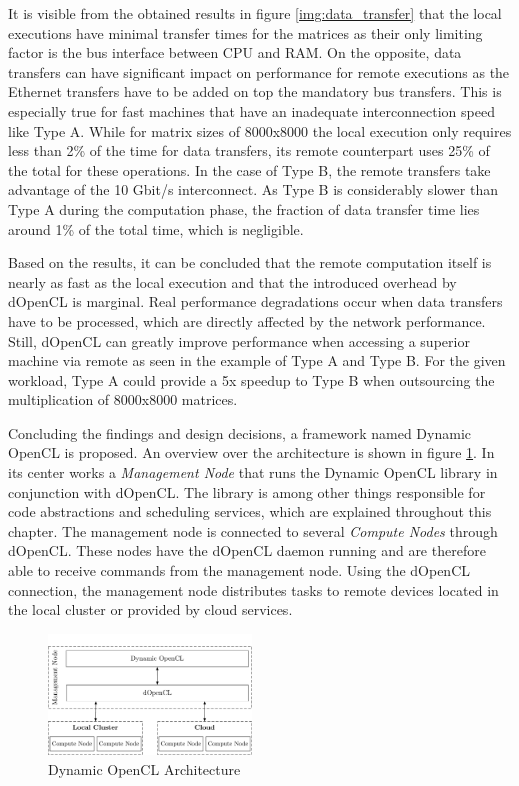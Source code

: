 It is visible from the obtained results in figure \ref{img:data_transfer} that the local executions have minimal transfer times for the matrices as their only limiting factor is the bus interface between CPU and RAM. On the opposite, data transfers can have significant impact on performance for remote executions as the Ethernet transfers have to be added on top the mandatory bus transfers. This is especially true for fast machines that have an inadequate interconnection speed like Type A. While for matrix sizes of 8000x8000 the local execution only requires less than 2\% of the time for data transfers, its remote counterpart uses 25\% of the total for these operations. In the case of Type B, the remote transfers take advantage of the 10 Gbit/s interconnect. As Type B is considerably slower than Type A during the computation phase, the fraction of data transfer time lies around 1\% of the total time, which is negligible.

Based on the results, it can be concluded that the remote computation itself is nearly as fast as the local execution and that the introduced overhead by dOpenCL is marginal. Real performance degradations occur when data transfers have to be processed, which are directly affected by the network performance. Still, dOpenCL can greatly improve performance when accessing a superior machine via remote as seen in the example of Type A and Type B. For the given workload, Type A could provide a 5x speedup to Type B when outsourcing the multiplication of 8000x8000 matrices.

Concluding the findings and design decisions, a framework named Dynamic OpenCL is proposed. An overview over the architecture is shown in figure \ref{img:dynamic_opencl_arch}. In its center works a \textit{Management Node} that runs the Dynamic OpenCL library in conjunction with dOpenCL. The library is among other things responsible for code abstractions and scheduling services, which are explained throughout this chapter. The management node is connected to several \textit{Compute Nodes} through dOpenCL. These nodes have the dOpenCL daemon running and are therefore able to receive commands from the management node. Using the dOpenCL connection, the management node distributes tasks to remote devices located in the local cluster or provided by cloud services.

\begin{figure}[H]

	\includegraphics[width=0.48\textwidth]{drawings/dynamic_opencl_arch.pdf}
	\centering
	\caption{Dynamic OpenCL Architecture}
	\label{img:dynamic_opencl_arch}
\end{figure}

